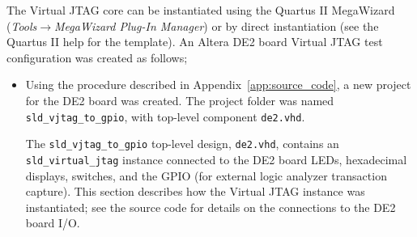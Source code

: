 \documentclass[10pt,twoside]{article}
\begin{document}
The Virtual JTAG core can be instantiated using the Quartus II
MegaWizard ({\em Tools$\rightarrow$MegaWizard Plug-In Manager})
or by direct instantiation (see the Quartus II help for
the template). 
%
An Altera DE2 board Virtual JTAG test configuration was
created as follows;
%
\begin{itemize}
\item Using the procedure described in Appendix~\ref{app:source_code},
a new project for the DE2 board was created. The project folder
was named \verb+sld_vjtag_to_gpio+, with top-level component
\verb+de2.vhd+.

The \verb+sld_vjtag_to_gpio+ top-level design, \verb+de2.vhd+, contains an
\verb+sld_virtual_jtag+ instance connected to the DE2 board LEDs,
hexadecimal displays, switches, and the GPIO (for external
logic analyzer transaction capture). This section
describes how the Virtual JTAG instance was instantiated;
see the source code for details on the connections to
the DE2 board I/O.


\end{itemize}
\end{document}
